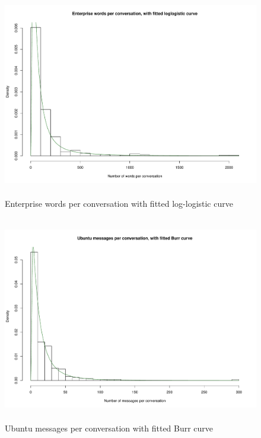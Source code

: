 \begin{figure}
\begin{center}
\caption{Enterprise words per conversation with fitted log-logistic curve}
\label{fig:chapt6fig12}
\includegraphics[height=9cm, width=13cm]{graphs/different/12_words_enterprise.pdf} 
\end{center}
\end{figure}

\begin{figure}
\begin{center}
\caption{Ubuntu messages per conversation with fitted Burr curve}
\label{fig:chapt6fig13}
\includegraphics[height=9cm, width=13cm]{graphs/different/13_messages_ubuntu.pdf} 
\end{center}
\end{figure}

